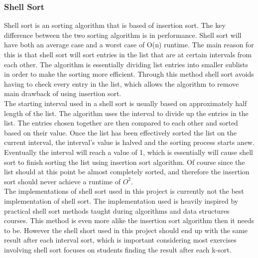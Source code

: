 \subsubsection{Shell Sort}
Shell sort is an sorting algorithm that is based of insertion sort. The key difference between the two sorting algorithm is in performance. Shell sort will have both an average case and a worst case of O(n) runtime. The main reason for this is that shell sort will sort entries in the list that are at certain intervals from each other. The algorithm is essentially dividing list entries into smaller sublists in order to make the sorting more efficient. Through this method shell sort avoids having to check every entry in the list, which allows the algorithm to remove main drawback of using insertion sort.
\\[11pt]
The starting interval used in a shell sort is usually based on approximately half length of the list. The algorithm uses the interval to divide up the entries in the list. The entries chosen together are then compared to each other and sorted based on their value. Once the list has been effectively sorted the list on the current interval, the interval's value is halved and the sorting process starts anew. Eventually the interval will reach a value of 1, which is essentially will cause shell sort to finish sorting the list using insertion sort algorithm. Of course since the list should at this point be almost completely sorted, and therefore the insertion sort should never achieve a runtime of $O^2$.
\\[11pt]
The implementations of shell sort used in this project is currently not the best implementation of shell sort. The implementation used is heavily inspired by practical shell sort methods taught during algorithms and data structures courses. This method is even more alike the insertion sort algorithm then it needs to be. However the shell short used in this project should end up with the same result after each interval sort, which is important considering most exercises involving shell sort focuses on students finding the result after each k-sort.  
